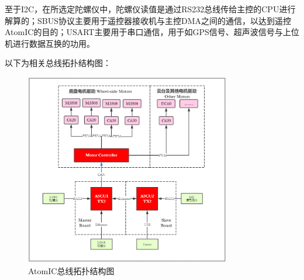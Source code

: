 至于I2C，在所选定陀螺仪中，陀螺仪读值是通过RS232总线传给主控的CPU进行解算的；SBUS协议主要用于遥控器接收机与主控DMA之间的通信，以达到遥控AtomIC的目的；USART主要用于串口通信，用于如GPS信号、超声波信号与上位机进行数据互换的功用。

以下为相关总线拓扑结构图：

\begin{figure}[H]
	\centering
	\includegraphics[width = 0.8\textwidth]{fig/zxtp.png}
	\caption{AtomIC总线拓扑结构图}
	\label{zxtp}
\end{figure}